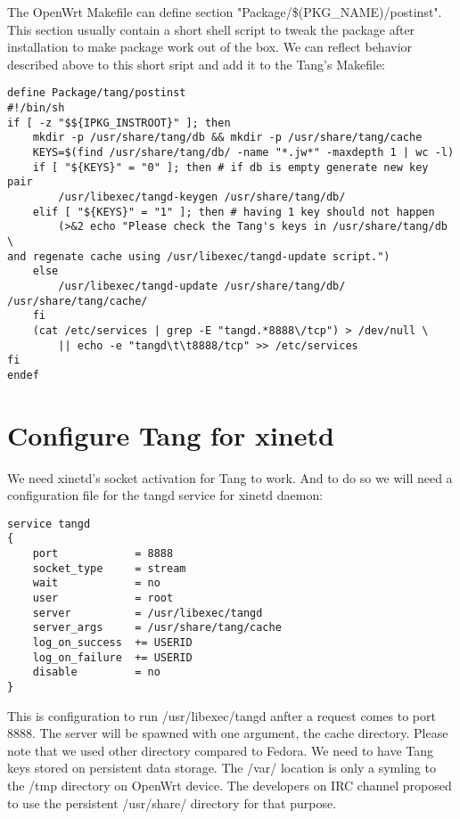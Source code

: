 The OpenWrt Makefile can define section "Package/\$(PKG\_NAME)/postinst".
This section usually contain a short shell script to tweak the package after installation to make package work out of the box.
We can reflect behavior described above to this short sript and add it to the Tang's Makefile:
\begin{lstlisting}[columns=fixed,basicstyle=\ttfamily\footnotesize,tabsize=4,backgroundcolor=\color{yellow!10}]
define Package/tang/postinst
#!/bin/sh
if [ -z "$${IPKG_INSTROOT}" ]; then
	mkdir -p /usr/share/tang/db && mkdir -p /usr/share/tang/cache
	KEYS=$(find /usr/share/tang/db/ -name "*.jw*" -maxdepth 1 | wc -l)
	if [ "${KEYS}" = "0" ]; then # if db is empty generate new key pair
		/usr/libexec/tangd-keygen /usr/share/tang/db/
	elif [ "${KEYS}" = "1" ]; then # having 1 key should not happen
		(>&2 echo "Please check the Tang's keys in /usr/share/tang/db \
and regenate cache using /usr/libexec/tangd-update script.")
	else
		/usr/libexec/tangd-update /usr/share/tang/db/ /usr/share/tang/cache/
	fi
	(cat /etc/services | grep -E "tangd.*8888\/tcp") > /dev/null \
		|| echo -e "tangd\t\t8888/tcp" >> /etc/services
fi
endef
\end{lstlisting}



\section{Configure Tang for xinetd}

We need xinetd's socket activation for Tang to work.
And to do so we will need a configuration file for the tangd service for xinetd daemon:
\begin{lstlisting}[columns=fixed,basicstyle=\ttfamily\footnotesize,tabsize=4,backgroundcolor=\color{yellow!10},caption=Configuration of Tang service for xinetd]
service tangd
{
    port            = 8888
    socket_type     = stream
    wait            = no
    user            = root
    server          = /usr/libexec/tangd
    server_args     = /usr/share/tang/cache
    log_on_success  += USERID
    log_on_failure  += USERID
    disable         = no
}
\end{lstlisting}
This is configuration to run /usr/libexec/tangd anfter a request comes to port 8888.
The server will be spawned with one argument, the cache directory.
Please note that we used other directory compared to Fedora.
We need to have Tang keys stored on persistent data storage.
The /var/ location is only a symling to the /tmp directory on OpenWrt device.
The developers on IRC channel proposed to use the persistent /usr/share/ directory for that purpose.

